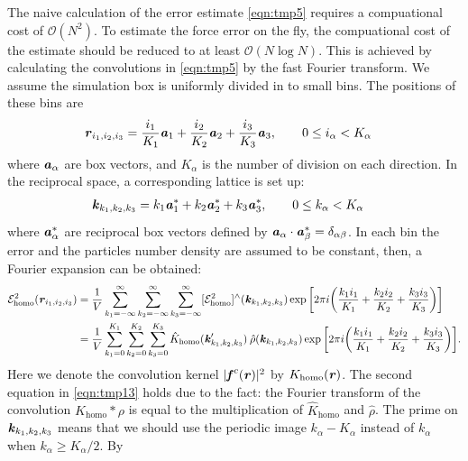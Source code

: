 \documentclass[aps,pre,preprint]{revtex4-1}
\renewcommand{\v}[1]{\textbf{\textit{#1}}}
\begin{document}
The naive calculation of the error estimate \eqref{eqn:tmp5} requires
a compuational cost of $\mathcal O(N^2)$. To estimate the force error
on the fly, the compuational cost of the estimate should be reduced to
at least $\mathcal O(N\log N)$.  This is achieved by calculating the
convolutions in \eqref{eqn:tmp5} by the fast Fourier transform. We
assume the simulation box is uniformly divided in to small bins.  The
positions of these bins are
\begin{align}
  \v r_{i_1, i_2, i_3} & =
  \frac{i_1}{K_1}\v a_1 + 
  \frac{i_2}{K_2}\v a_2 + 
  \frac{i_3}{K_3}\v a_3,\qquad 0\leq i_\alpha< K_\alpha
\end{align}
where $\v a_\alpha$ are box vectors, and $K_\alpha$ is the number of
division on each direction. In the reciprocal space, a corresponding
lattice is set up:
\begin{align}
  \v k_{k_1, k_2, k_3} & =
  k_1\v a_1^\ast +
  k_2\v a_2^\ast +
  k_3\v a_3^\ast, \qquad 0\leq k_\alpha<K_\alpha
\end{align}
where $\v a_\alpha^\ast$ are reciprocal box vectors defined by $\v
a_\alpha\cdot\v a_\beta^\ast = \delta_{\alpha\beta}$.  In each bin the
error and the particles number density are assumed to be constant,
then, a Fourier expansion can be obtained:
\begin{align}\nonumber
  \mathcal E^2_{\textrm{homo}}(\v r_{i_1,i_2,i_3})
  & =
  \frac1V\sum_{k_1=-\infty}^\infty\sum_{k_2=-\infty}^\infty\sum_{k_3=-\infty}^\infty
  [{\mathcal E}^2_{\textrm{homo}}]^{\wedge}(\v k_{k_1,k_2,k_3})
  \exp\bigg[
  2\pi i\bigg(
  \frac{k_1i_1}{K_1} + \frac{k_2i_2}{K_2} + \frac{k_3i_3}{K_3}
  \bigg)
  \bigg] \\\label{eqn:tmp13}
  & =
  \frac1V\sum_{k_1=0}^{K_1}\sum_{k_2=0}^{K_2}\sum_{k_3=0}^{K_3}
  \hat{K}_{\textrm{homo}}(\v k'_{k_1,k_2,k_3})\:
  \hat{\rho}(\v k_{k_1,k_2,k_3})
  \exp\bigg[
  2\pi i\bigg(
  \frac{k_1i_1}{K_1} + \frac{k_2i_2}{K_2} + \frac{k_3i_3}{K_3}
  \bigg)
  \bigg].
\end{align}
Here we denote the convolution kernel $\vert\v f^c(\v r)\vert^2$ by
$K_{\textrm{homo}}(\v r)$.  The second equation in \eqref{eqn:tmp13}
holds due to the fact: the Fourier transform of the convolution
$K_{\textrm{homo}}\ast\rho$ is equal to the multiplication of
$\hat{K}_{\textrm{homo}}$ and $\hat\rho$.  The prime on $\v
k_{k_1,k_2,k_3}$ means that we should use the periodic image $k_\alpha
- K_\alpha$ instead of $k_\alpha$ when $k_\alpha \geq K_\alpha/2$. By
\end{document}
